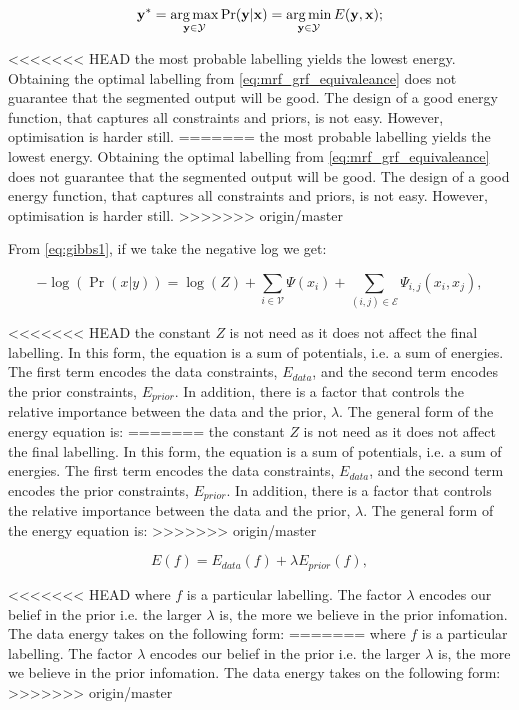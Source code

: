 \begin{equation}
\mathbf{y^*} = \operatorname*{arg\,max}_{\mathbf{y} \in \mathcal{Y}}\Pr(\mathbf{y}|\mathbf{x}) = \operatorname*{arg\,min}_{\mathbf{y} \in \mathcal{Y}}E(\mathbf{y},\mathbf{x});
\label{eq:mrf_grf_equivaleance}
\end{equation}

<<<<<<< HEAD
the most probable labelling yields the lowest energy.
Obtaining the optimal labelling from \autoref{eq:mrf_grf_equivaleance} does not guarantee that the segmented output will be good.
The design of a good energy function, that captures all constraints and priors, is not easy.
However, optimisation is harder still.
=======
the most probable labelling yields the lowest energy. Obtaining the optimal labelling from \autoref{eq:mrf_grf_equivaleance} does not guarantee that the segmented output will be good. The design of a good energy function, that captures all constraints and priors, is not easy. However, optimisation is harder still.
>>>>>>> origin/master

From \autoref{eq:gibbs1}, if we take the negative log we get:

\begin{equation}
	-\log(\Pr(x|y)) = \log(Z) + \sum_{i \in \mathcal{V}}\Psi(x_i) + \sum_{(i,j) \in \mathcal{E}}\Psi_{i,j}(x_i,x_j),
\end{equation}

<<<<<<< HEAD
the constant $Z$ is not need as it does not affect the final labelling.
In this form, the equation is a sum of potentials, i.e. a sum of energies.
The first term encodes the data constraints, $E_{data}$, and the second term encodes the prior constraints, $E_{prior}$.
In addition, there is a factor that controls the relative importance between the data and the prior, $\lambda$.
The general form of the energy equation is:
=======
the constant $Z$ is not need as it does not affect the final labelling. In this form, the equation is a sum of potentials, i.e. a sum of energies. The first term encodes the data constraints, $E_{data}$, and the second term encodes the prior constraints, $E_{prior}$. In addition, there is a factor that controls the relative importance between the data and the prior, $\lambda$. The general form of the energy equation is:
>>>>>>> origin/master

\begin{equation}
	E(f) = E_{data}(f) + \lambda E_{prior}(f),
	\label{eq:generalform}
\end{equation}

<<<<<<< HEAD
where $f$ is a particular labelling.
The factor $\lambda$ encodes our belief in the prior i.e. the larger $\lambda$ is, the more we believe in the prior infomation.
The data energy takes on the following form:
=======
where $f$ is a particular labelling. The factor $\lambda$ encodes our belief in the prior i.e. the larger $\lambda$ is, the more we believe in the prior infomation. The data energy takes on the following form:
>>>>>>> origin/master

